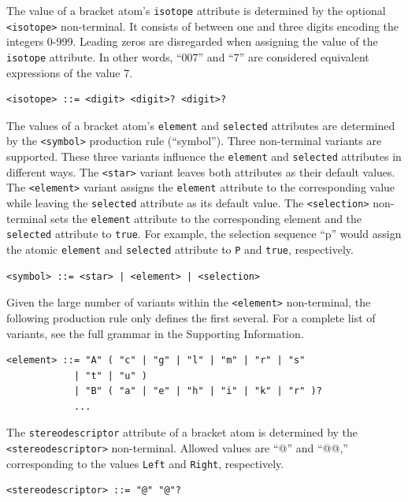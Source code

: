 \documentclass{article}
\def\ttt{\texttt}
\begin{document}
The value of a bracket atom's \ttt{isotope} attribute is determined by the optional \ttt{<isotope>} non-terminal. It consists of between one and three digits encoding the integers 0-999. Leading zeros are disregarded when assigning the value of the \ttt{isotope} attribute. In other words, \enquote{007} and \enquote{7} are considered equivalent expressions of the value 7.

\begin{lstlisting}
<isotope> ::= <digit> <digit>? <digit>?
\end{lstlisting}

The values of a bracket atom's \ttt{element} and \ttt{selected} attributes are determined by the \ttt{<symbol>} production rule (\enquote{symbol}). Three non-terminal variants are supported. These three variants influence the \ttt{element} and \ttt{selected} attributes in different ways. The \ttt{<star>} variant leaves both attributes as their default values. The \ttt{<element>} variant assigns the \ttt{element} attribute to the corresponding value while leaving the \ttt{selected} attribute as its default value. The \ttt{<selection>} non-terminal sets the \ttt{element} attribute to the corresponding element and the \ttt{selected} attribute to \ttt{true}. For example, the selection sequence \enquote{p} would assign the atomic \ttt{element} and \ttt{selected} attribute to \ttt{P} and \ttt{true}, respectively.

\begin{lstlisting}
<symbol> ::= <star> | <element> | <selection>
\end{lstlisting}

Given the large number of variants within the \ttt{<element>} non-terminal, the following production rule only defines the first several. For a complete list of variants, see the full grammar in the Supporting Information.

\begin{lstlisting}
<element> ::= "A" ( "c" | "g" | "l" | "m" | "r" | "s"
            | "t" | "u" )
            | "B" ( "a" | "e" | "h" | "i" | "k" | "r" )?
            ...
\end{lstlisting}

The \ttt{stereodescriptor} attribute of a bracket atom is determined by the \ttt{<stereodescriptor>} non-terminal. Allowed values are \enquote{@} and \enquote{@@,} corresponding to the values \ttt{Left} and \ttt{Right}, respectively.

\begin{lstlisting}
<stereodescriptor> ::= "@" "@"?
\end{lstlisting}
\end{document}
